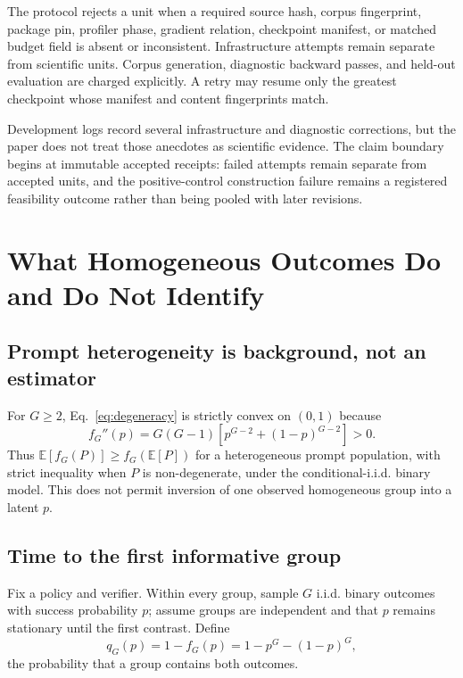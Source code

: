 \documentclass{article}
\newcommand{\E}{\mathbb{E}}
\begin{document}
The protocol rejects a unit when a required source hash, corpus fingerprint,
package pin, profiler phase, gradient relation, checkpoint manifest, or matched
budget field is absent or inconsistent.  Infrastructure attempts remain
separate from scientific units.  Corpus generation, diagnostic backward
passes, and held-out evaluation are charged explicitly.  A retry may resume
only the greatest checkpoint whose manifest and content fingerprints match.

Development logs record several infrastructure and diagnostic corrections, but
the paper does not treat those anecdotes as scientific evidence.  The claim
boundary begins at immutable accepted receipts: failed attempts remain separate
from accepted units, and the positive-control construction failure remains a
registered feasibility outcome rather than being pooled with later revisions.

\section{What Homogeneous Outcomes Do and Do Not Identify}
\label{sec:theory}

\subsection{Prompt heterogeneity is background, not an estimator}

For $G\geq2$, Eq.~\eqref{eq:degeneracy} is strictly convex on $(0,1)$ because
\begin{equation}
  f_G''(p)=G(G-1)\left[p^{G-2}+(1-p)^{G-2}\right]>0.
\end{equation}
Thus $\E[f_G(P)]\geq f_G(\E[P])$ for a heterogeneous prompt population, with
strict inequality when $P$ is non-degenerate, under the conditional-i.i.d.
binary model.  This does not permit inversion of one observed homogeneous group
into a latent $p$.

\subsection{Time to the first informative group}

Fix a policy and verifier.  Within every group, sample $G$ i.i.d. binary
outcomes with success probability $p$; assume groups are independent and that
$p$ remains stationary until the first contrast.  Define
\begin{equation}
  q_G(p)=1-f_G(p)=1-p^G-(1-p)^G,
\end{equation}
the probability that a group contains both outcomes.
\end{document}
